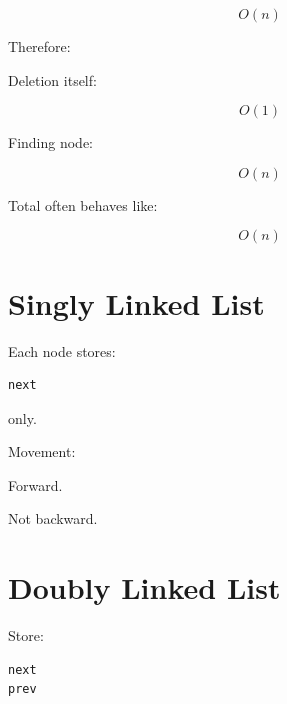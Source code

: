 \documentclass[11pt,a4paper]{book}
\begin{document}
\[
O(n)
\]


Therefore:


Deletion itself:

\[
O(1)
\]


Finding node:

\[
O(n)
\]


Total often behaves like:

\[
O(n)
\]


\section{Singly Linked List}

Each node stores:

\begin{verbatim} 
next
\end{verbatim}


only.


Movement:


Forward.


Not backward.


\section{Doubly Linked List}

Store:

\begin{verbatim} 
next
prev
\end{verbatim}

\end{document}
